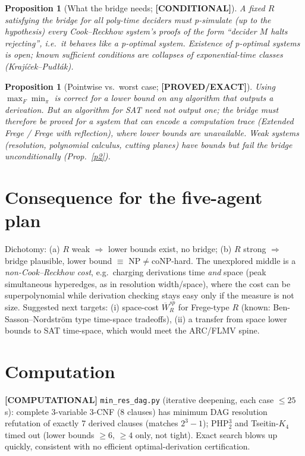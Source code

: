 \documentclass[11pt]{article}
\newtheorem{proposition}[theorem]{Proposition}
\newcommand{\status}[1]{\textbf{[#1]}}
\begin{document}
\begin{proposition}[What the bridge needs; \status{CONDITIONAL}]
A fixed $R$ satisfying the bridge for all poly-time deciders must p-simulate (up to the hypothesis) every Cook--Reckhow system's proofs of the form ``decider $M$ halts rejecting'', i.e.\ it behaves like a p-optimal system. Existence of p-optimal systems is open; known sufficient conditions are collapses of exponential-time classes (Kraj\'i\v{c}ek--Pud\l\'ak).
\end{proposition}

\begin{proposition}[Pointwise vs.\ worst case; \status{PROVED/EXACT}]
Using $\max_F\min_\pi$ is correct for a lower bound on any algorithm that outputs a derivation. But an algorithm for SAT need not output one; the bridge must therefore be proved for a system that can \emph{encode a computation trace} (Extended Frege / Frege with reflection), where lower bounds are unavailable. Weak systems (resolution, polynomial calculus, cutting planes) have bounds but fail the bridge unconditionally (Prop.~\ref{p2}).
\end{proposition}

\section{Consequence for the five-agent plan}
Dichotomy: (a) $R$ weak $\Rightarrow$ lower bounds exist, no bridge; (b) $R$ strong $\Rightarrow$ bridge plausible, lower bound $\equiv$ NP$\neq$coNP-hard. The unexplored middle is a \emph{non-Cook--Reckhow cost}, e.g.\ charging derivations time \emph{and} space (peak simultaneous hyperedges, as in resolution width/space), where the cost can be superpolynomial while derivation checking stays easy only if the measure is not size. Suggested next targets: (i) space-cost $\overline W^{sp}_R$ for Frege-type $R$ (known: Ben-Sasson--Nordstr\"om type time-space tradeoffs), (ii) a transfer from space lower bounds to SAT time-space, which would meet the ARC/FLMV spine.

\section{Computation}
\status{COMPUTATIONAL} \texttt{min\_res\_dag.py} (iterative deepening, each case $\le25$ s): complete 3-variable 3-CNF (8 clauses) has minimum DAG resolution refutation of exactly 7 derived clauses (matches $2^3-1$); PHP$_2^3$ and Tseitin-$K_4$ timed out (lower bounds $\ge6$, $\ge4$ only, not tight). Exact search blows up quickly, consistent with no efficient optimal-derivation certification.
\end{document}
